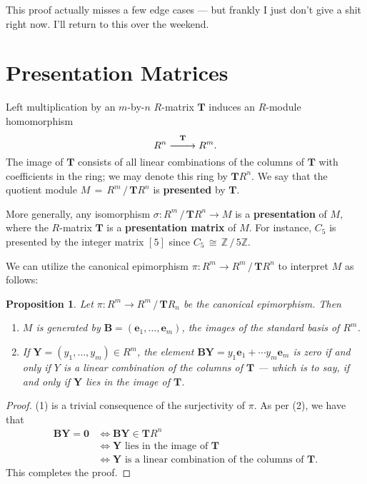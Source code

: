 \documentclass[11pt]{article}
\newtheorem{proposition}{Proposition}
\renewcommand{\longrightarrow}{\xrightarrow{\hspace*{0.7cm}}}
\renewcommand{\vec}[1]{\mathbf{#1}}
\newcommand{\mat}[1]{\mathbf{#1}}
\begin{document}
This proof actually misses a few edge cases --- but frankly I just don't give a shit right now. I'll return to this over the weekend.


\section{Presentation Matrices}

Left multiplication by an $m$-by-$n$ $R$-matrix $\mat{T}$ induces an $R$-module homomorphism
\[
  R^{n} \stackrel{\mat{T}}{\longrightarrow} R^{m}. 
\]
The image of $\mat{T}$ consists of all linear combinations of the columns of $\mat{T}$ with coefficients in the ring; we may denote this ring by $\mat{T} R^{n}$. We say that the quotient module $M \, = \, R^{m} \, / \, \mat{T} R^{n}$ is \textbf{presented} by $\mat{T}$. 

More generally, any isomorphism $\sigma : R^{m} \, / \, \mat{T} R^{n} \to M$ is a \textbf{presentation} of $M$, where the $R$-matrix $\mat{T}$ is a \textbf{presentation matrix} of $M$. For instance, $C_{5}$ is presented by the integer matrix $[5]$ since $C_{5} \, \cong \, \mathbb{Z} \, / \, 5 \mathbb{Z}$.

We can utilize the canonical epimorphism $\pi : R^{m} \to R^{m} \, / \, \mat{T} R^{n}$ to interpret $M$ as follows:

\newpage

\begin{adjustwidth}{0.5cm}{}
  \begin{proposition}
    Let $\pi : R^{m} \to R^{m} \, / \, \mat{T} R_{n}$ be the canonical epimorphism. Then 
    \begin{enumerate}
      \item $M$ is generated by $\vec{B} = (\vec{e}_{1}, \ldots, \vec{e}_{m})$, the images of the standard basis of $R^{m}$.
      \item If $\vec{Y} = (y_{1}, \ldots, y_{m}) \in R^{m}$, the element $\mat{B}\vec{Y} = y_{1} \vec{e}_{1} + \cdots y_{m} \vec{e}_{m}$ is zero if and only if $Y$ is a linear combination of the columns of $\vec{T}$ --- which is to say, if and only if $\vec{Y}$ lies in the image of $\mat{T}$.
    \end{enumerate}
  \end{proposition}
  \begin{proof}
    (1) is a trivial consequence of the surjectivity of $\pi$. As per (2), we have that
    \begin{align*}
      \text{$\vec{BY} = \vec{0}$} & \iff \text{$\vec{BY} \in \mat{T} R^{n}$} \\ 
                                  & \iff \text{$\vec{Y}$ lies in the image of $\mat{T}$} \\
                                  & \iff \text{$\vec{Y}$ is a linear combination of the columns of $\mat{T}$}.
    \end{align*}
    This completes the proof.
  \end{proof}
\end{adjustwidth}
\end{document}
